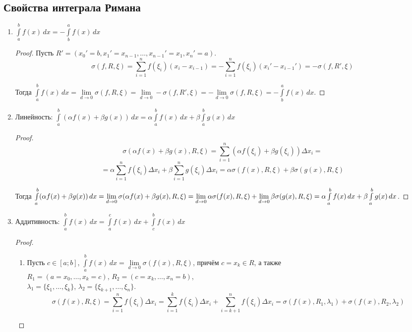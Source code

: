 \subsection{Свойства интеграла Римана}
\begin{enumerate}
	\item \label{st:b_a_integral} $\int\limits_a^b f(x)\,dx = -\int\limits_b^a f(x)\,dx$
	\begin{proof}
	Пусть $R' = (x_0' = b, x_1' = x_{n-1}, \ldots, x_{n-1}' = x_1, x_n' = a)$.
	\begin{equation*}
	\sigma(f, R, \xi) =
	\sum_{i=1}^n f(\xi_i) (x_i - x_{i-1}) =
	-\sum_{i=1}^n f(\xi_i) (x_i' - x_{i-1}') =
	-\sigma(f, R', \xi)
	\end{equation*}
	
	Тогда $\int\limits_a^b f(x)\,dx =
	\lim\limits_{d \to 0} \sigma(f, R, \xi) =
	\lim\limits_{d \to 0} -\sigma(f, R', \xi) =
	-\lim\limits_{d \to 0} \sigma(f, R, \xi) =
	-\int\limits_b^a f(x)\,dx$.
	\end{proof}
	
	\item Линейность: $\int\limits_a^b (\alpha f(x) + \beta g(x))\,dx = 
	\alpha \int\limits_a^b f(x)\,dx + \beta \int\limits_a^b g(x)\,dx$
	\begin{proof}
	\begin{equation*}
	\sigma(\alpha f(x) + \beta g(x), R, \xi) =
	\sum_{i=1}^n (\alpha f(\xi_i) + \beta g(\xi_i)) \Delta x_i =
	\end{equation*}
	\begin{equation*}
	= \alpha \sum_{i=1}^n f(\xi_i) \Delta x_i + \beta \sum_{i=1}^n g(\xi_i) \Delta x_i =
	\alpha \sigma(f(x), R, \xi) + \beta \sigma(g(x), R, \xi)
	\end{equation*}
	
	Тогда $\int\limits_a^b (\alpha f(x) + \beta g(x))\,dx =
	\lim\limits_{d \to 0} \sigma(\alpha f(x) + \beta g(x), R, \xi) =
	\lim\limits_{d \to 0} \alpha \sigma(f(x), R, \xi) + \lim\limits_{d \to 0} \beta \sigma(g(x), R, \xi) \opbr=
	\alpha \int\limits_a^b f(x)\,dx \opbr+ \beta \int\limits_a^b g(x)\,dx$.
	\end{proof}
	
	\item Аддитивность: $\int\limits_a^b f(x)\,dx = \int\limits_a^c f(x)\,dx + \int\limits_c^b f(x)\,dx$
	\begin{proof}
	\begin{enumerate}
		\item Пусть $c \in [a; b]$, $\int\limits_a^b f(x)\,dx = \lim\limits_{d \to 0} \sigma(f(x), R, \xi)$, причём $c = x_k \in R$, а также\\
		$R_1 = (a = x_0, \ldots, x_k = c)$, $R_2 = (c = x_k, \ldots, x_n = b)$,\\
		$\lambda_1 = \{ \xi_1, \ldots, \xi_k \}$, $\lambda_2 = \{ \xi_{k+1}, \ldots, \xi_n \}$.
		\begin{equation*}
		\sigma(f(x), R, \xi) =
		\sum_{i=1}^n f(\xi_i) \Delta x_i =
		\sum_{i=1}^k f(\xi_i) \Delta x_i + \sum_{i=k+1}^n f(\xi_i) \Delta x_i =
		\sigma(f(x), R_1, \lambda_1) + \sigma(f(x), R_2, \lambda_2)
		\end{equation*}
		

\end{enumerate}
\end{proof}
\end{enumerate}
